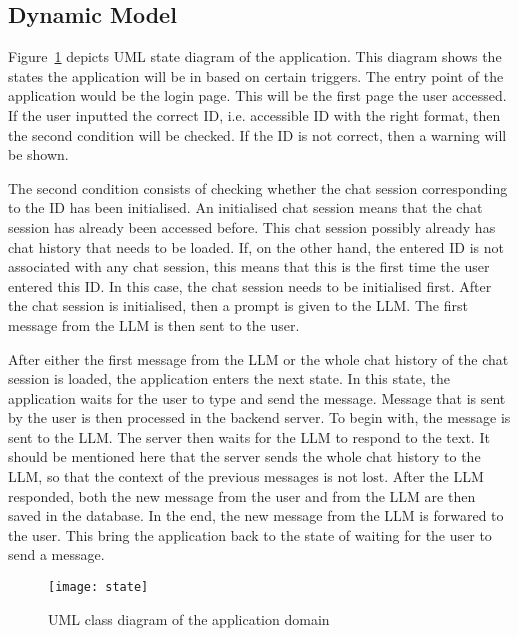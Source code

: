 \subsection{Dynamic Model}


Figure~\ref{state} depicts UML state diagram of the application.
This diagram shows the states the application will be in based on certain triggers.
The entry point of the application would be the login page.
This will be the first page the user accessed.
If the user inputted the correct ID, i.e. accessible ID with the right format, then the second condition will be checked.
If the ID is not correct, then a warning will be shown.

The second condition consists of checking whether the chat session corresponding to the ID has been initialised.
An initialised chat session means that the chat session has already been accessed before.
This chat session possibly already has chat history that needs to be loaded.
If, on the other hand, the entered ID is not associated with any chat session, this means that this is the first time the user entered this ID.
In this case, the chat session needs to be initialised first.
After the chat session is initialised, then a prompt is given to the \ac{LLM}.
The first message from the \ac{LLM} is then sent to the user.

After either the first message from the \ac{LLM} or the whole chat history of the chat session is loaded, the application enters the next state.
In this state, the application waits for the user to type and send the message.
Message that is sent by the user is then processed in the backend server.
To begin with, the message is sent to the \ac{LLM}.
The server then waits for the \ac{LLM} to respond to the text.
It should be mentioned here that the server sends the whole chat history to the \ac{LLM}, so that the context of the previous messages is not lost.
After the \ac{LLM} responded, both the new message from the user and from the \ac{LLM} are then saved in the database.
In the end, the new message from the \ac{LLM} is forwared to the user.
This bring the application back to the state of waiting for the user to send a message.

\begin{figure}[h!]
    \centering
    \texttt{[image: state]}
    \caption{UML class diagram of the application domain}\label{state}
\end{figure}

